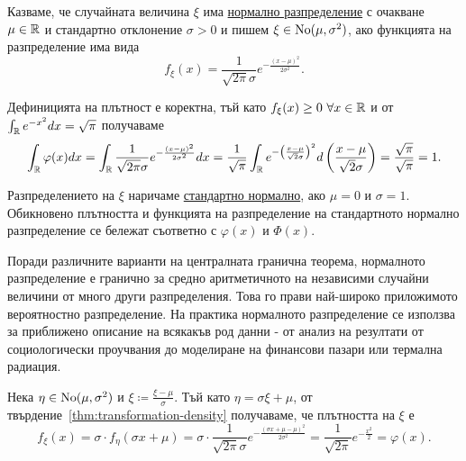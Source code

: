 \documentclass[numbers=endperiod, DIV=15, bibliography=totocnumbered]{scrartcl}
\begin{document}
\begin{definition}
  Казваме, че случайната величина $\xi$ има \uline{нормално разпределение} с очакване $\mu \in \mathbb{R}$ и стандартно отклонение $\sigma > 0$ и пишем $\xi \in \operatorname{No}(\mu, \sigma^2)$, ако функцията на разпределение има вида
  \begin{displaymath}
    f_\xi(x) = \frac 1 {\sqrt{2\pi} \sigma} e^{-\frac{{(x-\mu)}^2} {2\sigma^2}}.
  \end{displaymath}

  Дефиницията на плътност е коректна, тъй като $f_\xi(x) \geq 0~\forall x \in \mathbb{R}$ и от $\int_{\mathbb{R}} e^{-x^2} dx = \sqrt \pi$ получаваме
  \begin{displaymath}
    \int_{\mathbb{R}} \varphi(x) dx
    =
    \int_{\mathbb{R}} \frac 1 {\sqrt{2\pi} \sigma} e^{-\frac{{(x-\mu)}^2} {2\sigma^2}} dx
    =
    \frac 1 {\sqrt{\pi}} \int_{\mathbb{R}} e^{-{\left(\frac {x-\mu} {\sqrt 2 \sigma} \right)}^2} d\left(\frac {x-\mu} {\sqrt 2 \sigma} \right)
    =
    \frac {\sqrt{\pi}} {\sqrt{\pi}}
    =
    1.
  \end{displaymath}

  Разпределението на $\xi$ наричаме \uline{стандартно нормално}, ако $\mu = 0$ и $\sigma = 1$. Обикновено плътността и функцията на разпределение на стандартното нормално разпределение се бележат съответно с $\varphi(x)$ и $\Phi(x)$.
\end{definition}

Поради различните варианти на централната гранична теорема, нормалното разпределение е гранично за средно аритметичното на независими случайни величини от много други разпределения. Това го прави най-широко приложимото вероятностно разпределение. На практика нормалното разпределение се използва за приближено описание на всякакъв род данни - от анализ на резултати от социологически проучвания до моделиране на финансови пазари или термална радиация.

Нека $\eta \in \operatorname{No}(\mu, \sigma^2)$ и $\xi \coloneqq \frac {\xi - \mu} \sigma$. Тъй като $\eta = \sigma \xi + \mu$, от твърдение~\ref{thm:transformation-density} получаваме, че плътността на $\xi$ е
\begin{displaymath}
  f_\xi(x)
  =
  \sigma \cdot f_\eta(\sigma x + \mu)
  =
  \sigma \cdot \frac 1 {\sqrt{2\pi} \sigma} e^{-\frac{{(\sigma x + \mu -\mu)}^2} {2\sigma^2}}
  =
  \frac 1 {\sqrt{2\pi}} e^{-\frac {x^2} 2}
  =
  \varphi(x).
\end{displaymath}
\end{document}
